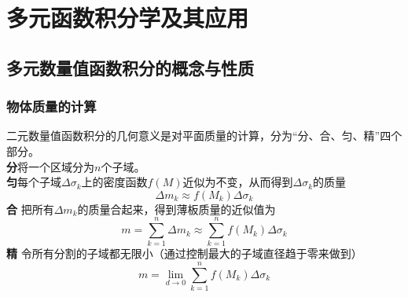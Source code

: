
\section{多元函数积分学及其应用}
\subsection{多元数量值函数积分的概念与性质}
\subsubsection{物体质量的计算}
二元数量值函数积分的几何意义是对平面质量的计算，分为“分、合、匀、精”四个部分。\\
\textbf{分}\quad	将一个区域分为$n$个子域。\\
\textbf{匀}\quad 每个子域$\Delta \sigma_k$上的密度函数$f(M)$近似为不变，从而得到$\Delta \sigma_k$的质量
\begin{equation}
	\Delta m_k \approx f(M_k) \Delta \sigma_k
\end{equation}
\textbf{合} \quad   把所有$\Delta m_k$的质量合起来，得到薄板质量的近似值为
\begin{equation}
	m = \sum_{k=1}^{n} \Delta m_k \approx \sum_{k=1}^{n} f(M_k) \Delta \sigma_k
\end{equation}
\textbf{精} \quad  令所有分割的子域都无限小（通过控制最大的子域直径趋于零来做到）
\begin{equation}
	m =\lim\limits_{d \rightarrow 0}\sum_{k=1}^{n} f(M_k)\Delta \sigma_k
\end{equation} 

